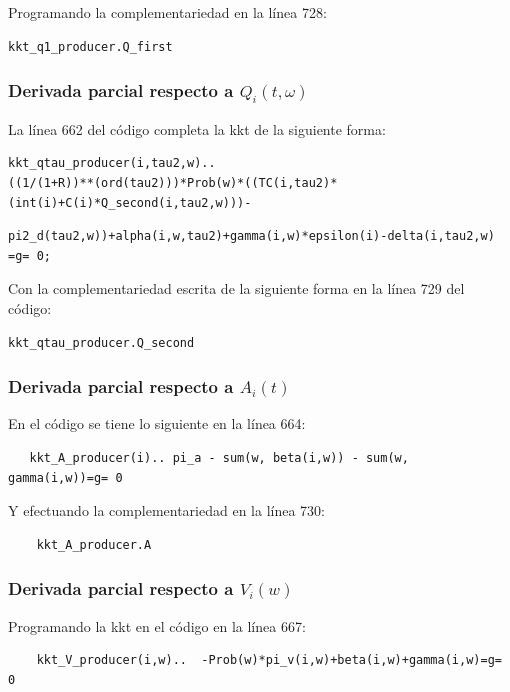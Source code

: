 Programando la complementariedad en la línea 728:

\begin{verbatim}
kkt_q1_producer.Q_first    
\end{verbatim}

\subsubsection{Derivada parcial respecto a $Q_i(t,\omega)$}

La línea 662 del código completa la kkt de la siguiente forma: 

\begin{verbatim}
kkt_qtau_producer(i,tau2,w).. 
((1/(1+R))**(ord(tau2)))*Prob(w)*((TC(i,tau2)*(int(i)+C(i)*Q_second(i,tau2,w)))- 
\end{verbatim}
\begin{verbatim}
pi2_d(tau2,w))+alpha(i,w,tau2)+gamma(i,w)*epsilon(i)-delta(i,tau2,w) =g= 0;
\end{verbatim}

Con la complementariedad escrita de la siguiente forma en la línea 729 del código:
\begin{verbatim}
kkt_qtau_producer.Q_second    
\end{verbatim}

\subsubsection{Derivada parcial respecto a $A_i(t)$}

En el código se tiene lo siguiente en la línea 664:
\begin{verbatim}
   kkt_A_producer(i).. pi_a - sum(w, beta(i,w)) - sum(w, gamma(i,w))=g= 0 
\end{verbatim}

Y efectuando la complementariedad en la línea 730:
\begin{verbatim}
    kkt_A_producer.A
\end{verbatim}

\subsubsection{Derivada parcial respecto a $V_i(w)$}
Programando la kkt en el código en la línea 667:
\begin{verbatim}
    kkt_V_producer(i,w)..  -Prob(w)*pi_v(i,w)+beta(i,w)+gamma(i,w)=g= 0
\end{verbatim}

